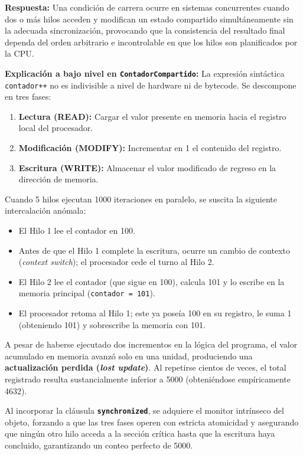 \documentclass[11pt,letterpaper]{article}
\begin{document}
\vspace{0.2cm}
\noindent \textbf{Respuesta:}
Una condición de carrera ocurre en sistemas concurrentes cuando dos o más hilos acceden y modifican un estado compartido simultáneamente sin la adecuada sincronización, provocando que la consistencia del resultado final dependa del orden arbitrario e incontrolable en que los hilos son planificados por la CPU.

\textbf{Explicación a bajo nivel en \texttt{ContadorCompartido}:}
La expresión sintáctica \texttt{contador++} no es indivisible a nivel de hardware ni de bytecode. Se descompone en tres fases:
\begin{enumerate}
    \item \textbf{Lectura (READ):} Cargar el valor presente en memoria hacia el registro local del procesador.
    \item \textbf{Modificación (MODIFY):} Incrementar en 1 el contenido del registro.
    \item \textbf{Escritura (WRITE):} Almacenar el valor modificado de regreso en la dirección de memoria.
\end{enumerate}

Cuando 5 hilos ejecutan 1000 iteraciones en paralelo, se suscita la siguiente intercalación anómala:
\begin{itemize}
    \item El Hilo 1 lee el contador en 100.
    \item Antes de que el Hilo 1 complete la escritura, ocurre un cambio de contexto (\textit{context switch}); el procesador cede el turno al Hilo 2.
    \item El Hilo 2 lee el contador (que sigue en 100), calcula 101 y lo escribe en la memoria principal (\texttt{contador = 101}).
    \item El procesador retoma al Hilo 1; este ya poseía 100 en su registro, le suma 1 (obteniendo 101) y sobrescribe la memoria con 101.
\end{itemize}
A pesar de haberse ejecutado dos incrementos en la lógica del programa, el valor acumulado en memoria avanzó solo en una unidad, produciendo una \textbf{actualización perdida (\textit{lost update})}. Al repetirse cientos de veces, el total registrado resulta sustancialmente inferior a 5000 (obteniéndose empíricamente 4632).

Al incorporar la cláusula \textbf{\texttt{synchronized}}, se adquiere el monitor intrínseco del objeto, forzando a que las tres fases operen con estricta atomicidad y asegurando que ningún otro hilo acceda a la sección crítica hasta que la escritura haya concluido, garantizando un conteo perfecto de 5000.
\end{document}
